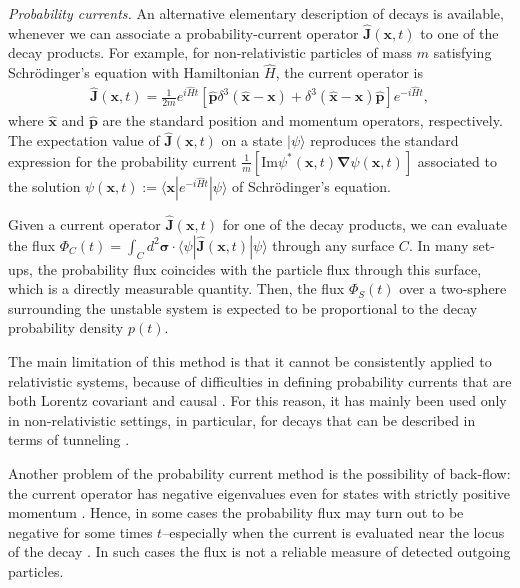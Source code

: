\documentclass[12pt]{article}
\numberwithin{equation}{section}
\begin{document}
 {\em Probability currents.}
 An alternative elementary description of decays is available, whenever we can  associate a probability-current operator $\hat{\pmb J}({\pmb x}, t)$ to one of the decay products. For example, for non-relativistic particles of mass $m$ satisfying Schr\"odinger's equation with Hamiltonian $\hat{H}$, the current operator is
\begin{eqnarray}
 \hat{\pmb J}({\pmb x}, t) = \frac{1}{2m}e^{i\hat{H} t}\left[ \hat{\pmb p} \delta^3(\hat{\pmb x} - {\pmb x}) + \delta^3(\hat{ \pmb x} - {\pmb x}) \hat{\pmb p} \right] e^{-i\hat{H}t},
\end{eqnarray}
where $\hat{\pmb x}$ and $\hat{\pmb p}$ are the standard position and momentum operators, respectively.
The expectation value of  $\hat{\pmb J}({\pmb x}, t)$ on a   state $|\psi\rangle $ reproduces the standard expression for the probability current $\frac{1}{m}[\mbox{Im} \psi^*({\pmb x}, t) {\pmb \nabla} \psi({\pmb x}, t)]$  associated to the solution $\psi({\pmb x}, t) := \langle {\pmb x}|e^{-i \hat{H}t}|\psi\rangle$ of Schr\"odinger's equation.

Given a current operator  $\hat{\pmb J}({\pmb x}, t)$ for one of the decay products, we can evaluate the flux  $\Phi_C(t) = \int_C d^2{\pmb \sigma} \cdot \langle \psi| \hat{\pmb J}({\pmb x}, t)|\psi\rangle$ through any surface $C$. In many set-ups, the probability flux  coincides with the particle flux through this surface, which is  a directly measurable quantity. Then, the flux $\Phi_S(t)$ over a two-sphere surrounding the unstable system is expected to be proportional to the decay probability density $p(t)$.

 The main limitation of this method is that it cannot be consistently applied to relativistic systems, because of difficulties in defining probability currents that are both  Lorentz covariant and causal \cite{RoHo}. For this reason, it has mainly been used only in non-relativistic settings, in particular, for decays that can be described in terms of tunneling \cite{LL, Perel}.

 Another problem of the probability current method is the possibility of back-flow: the current operator has  negative eigenvalues even for states with strictly positive momentum \cite{Brack}. Hence, in some cases the probability flux may turn out to be negative for some times $t$--especially when the current is evaluated near the locus of the decay \cite{Winter}. In such cases the flux is not a reliable measure of detected outgoing particles.
\end{document}
